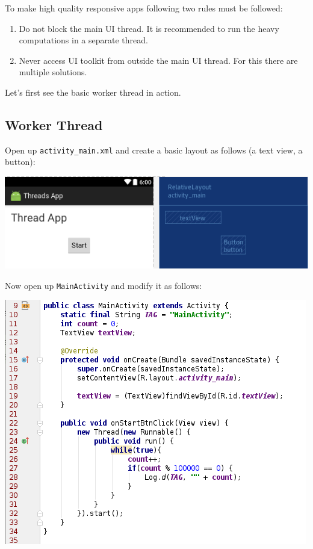 To make high quality responsive apps following two rules must be followed:

\begin{enumerate}
	\item Do not block the main UI thread. It is recommended to run the heavy computations in a separate thread. 
	\item Never access UI toolkit from outside the main UI thread. For this there are multiple solutions.
\end{enumerate}

Let's first see the basic worker thread in action.

\subsection{Worker Thread}
\label{TAS:workerThread}
Open up \texttt{activity\_main.xml} and create a basic layout as follows (a text view, a button):

\begin{center}
	\includegraphics[scale=\FigureScale]{chapters/ch14/images/18}
\end{center}

Now open up \texttt{MainActivity} and modify it as follows:

\begin{center}
	\includegraphics[scale=\SourceCodeScale]{chapters/ch14/images/19}
\end{center}

